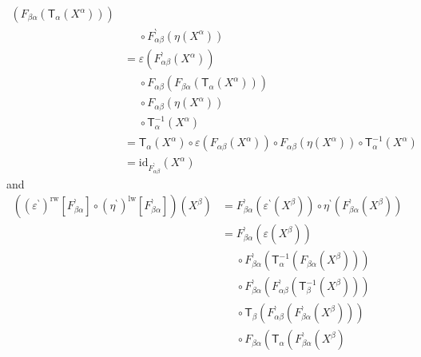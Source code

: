\begin{prf}
\begin{enumerate}
\begin{align*}
  \left(
    F_{\beta\alpha}
    \left(
      \mathsf{T}_{\alpha}(X^{\alpha})
    \right)
  \right)
  \\
  &\phantom{=}
  \circ
  F_{\alpha\beta}^{\backprime}
  \left(
    \eta(X^{\alpha})
  \right)
  \\
  &=
  \varepsilon
  \left(
    F_{\alpha\beta}^{\backprime}(X^{\alpha})
  \right)
  \\
  &\phantom{=}
  \circ
  F_{\alpha\beta}
  \left(
    F_{\beta\alpha}
    \left(
      \mathsf{T}_{\alpha}(X^{\alpha})
    \right)
  \right)
  \\
  &\phantom{=}
  \circ
  F_{\alpha\beta}
  \left(
    \eta(X^{\alpha})
  \right)
  \\
  &\phantom{=}
  \circ
  \mathsf{T}_{\alpha}^{-1}(X^{\alpha})
  \tag{NT}
  \\
  &=
  \mathsf{T}_{\alpha}(X^{\alpha})
  \circ
  \varepsilon
  \left(
    F_{\alpha\beta}(X^{\alpha})
  \right)
  \circ
  F_{\alpha\beta}
  \left(
    \eta(X^{\alpha})
  \right)
  \circ
  \mathsf{T}_{\alpha}^{-1}(X^{\alpha})
  \tag{NT}
  \\
  &=
  \mathrm{id}_{F_{\alpha\beta}^{\backprime}}(X^{\alpha})
\end{align*}
and
\begin{align*}
  \left(
    (\varepsilon^{\backprime})^{\textrm{rw}}[F_{\beta\alpha}^{\backprime}]
    \circ
    (\eta^{\backprime})^{\textrm{lw}}[F_{\beta\alpha}^{\backprime}]
  \right)
  (X^{\beta})
  &=
  F_{\beta\alpha}^{\backprime}
  \left(
    \varepsilon^{\backprime}(X^{\beta})
  \right)
  \circ
  \eta^{\backprime}
  \left(
    F_{\beta\alpha}^{\backprime}(X^{\beta})
  \right)
  \\
  &=
  F_{\beta\alpha}^{\backprime}
  \left(
    \varepsilon(X^{\beta})
  \right)
  \\
  &\phantom{=}
  \circ
  F_{\beta\alpha}^{\backprime}
  \left(
    \mathsf{T}_{\alpha}^{-1}
    \left(
      F_{\beta\alpha}(X^{\beta})
    \right)
  \right)
  \\
  &\phantom{=}
  \circ
  F_{\beta\alpha}^{\backprime}
  \left(
    F_{\alpha\beta}^{\backprime}
    \left(
      \mathsf{T}_{\beta}^{-1}(X^{\beta})
    \right)
  \right)
  \\
  &\phantom{=}
  \circ
  \mathsf{T}_{\beta}
  \left(
    F_{\alpha\beta}^{\backprime}
    \left(
      F_{\beta\alpha}^{\backprime}(X^{\beta})
    \right)
  \right)
  \\
  &\phantom{=}
  \circ
  F_{\beta\alpha}
  \left(
    \mathsf{T}_{\alpha}
    \left(
      F_{\beta\alpha}^{\backprime}(X^{\beta})

\end{align*}
\end{enumerate}
\end{prf}
